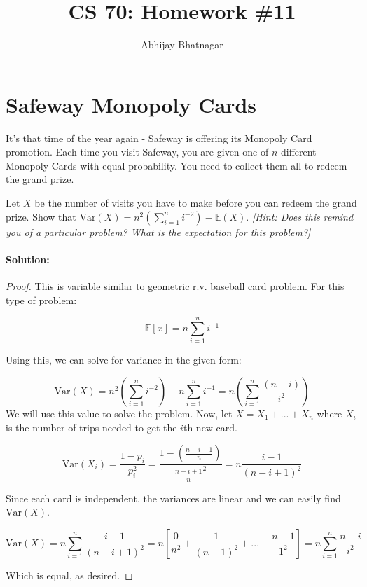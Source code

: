 \documentclass[11pt, notitlepage]{article}
\makeatletter
\newcommand{\E}{\mathbb{E}}
\newcommand{\var}[1]{\text{Var}(#1)}
\newcommand{\Question}[1]{\newpage\section{#1}}
\newenvironment{solution}{\paragraph{Solution:}}{\hfill \vspace{10mm}}
\newcommand*{\toccontents}{\@starttoc{toc}}
\makeatother
\begin{document}
   \title{CS 70: Homework \#11}
   \author{Abhijay Bhatnagar}
   \maketitle
   \toccontents

\Question{Safeway Monopoly Cards}
It's that time of the year again - Safeway is offering its Monopoly Card promotion. Each time you visit Safeway, you are given one of $n$ different Monopoly Cards with equal probability. You need to collect them all to redeem the grand prize.


     Let $X$ be the number of visits you have to make before you can redeem the grand prize. Show that $\var{X} = n^2\left(\sum_{i=1}^n i^{-2}\right) - \E(X)$. \textit{[Hint: Does this remind you of a particular problem? What is the expectation for this problem?]}
     
     \begin{solution}
     	\begin{proof}
     		This is variable similar to geometric r.v. baseball card problem. For this type of problem: 
     		
     		$$\E[x] = n\sum_{i=1}^{n}{i^{-1}}$$
     		     		
     		Using this, we can solve for variance in the given form: 
     		     		
     		$$\var{X}=n^2\left(\sum_{i=1}^n i^{-2}\right) -n\sum_{i=1}^{n}{i^{-1}}=n\left(\sum_{i=1}^n \frac{(n-i)}{i^{2}}\right)$$ We will use this value to solve the problem. Now, let $X = X_1 + ... + X_n$ where $X_i$ is the number of trips needed to get the $i$th new card.
			
			
     		$$\var{X_i} = \frac{1-p_i}{p_i^2} = \frac{1-(\frac{n-i+1}{n})}{\frac{n-i+1}{n}^2}=n\frac{i-1}{(n-i+1)^2}$$
     		
     		Since each card is independent, the variances are linear and we can easily find $\var{X}$.
     		
     		$$\var{X}=n\sum_{i=1}^{n}{\frac{i-1}{(n-i+1)^2}}=n\left[\frac{0}{n^2}+\frac{1}{(n-1)^2}+...+\frac{n-1}{1^2}\right]=n\sum_{i=1}^{n}{\frac{n-i}{i^2}}$$
     		
     		Which is equal, as desired.
     	\end{proof}
     \end{solution}
     
\end{document}
